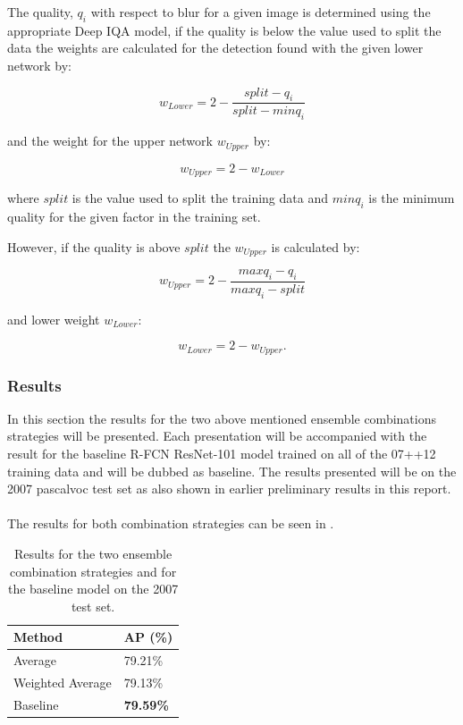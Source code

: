The quality, $q_i$ with respect to blur for a given image is determined using the appropriate Deep IQA model, if the quality is below the value used to split the data the weights are calculated for the detection found with the given lower network by:

\begin{equation}
	w_{Lower} = 2 - \frac{split - q_i}{split - minq_i}
\end{equation}

and the weight for the upper network $w_{Upper}$ by:

\begin{equation}
	w_{Upper} = 2 - w_{Lower}
\end{equation}

where $split$ is the value used to split the training data and $minq_i$ is the minimum quality for the given factor in the training set.

However, if the quality is above $split$ the $w_{Upper}$ is calculated by:

\begin{equation}
	w_{Upper} = 2 - \frac{maxq_i - q_i}{maxq_i - split}
\end{equation}

and lower weight $w_{Lower}$:

\begin{equation}
	w_{Lower} = 2 - w_{Upper}.
\end{equation}

\subsubsection{Results}
In this section the results for the two above mentioned ensemble combinations strategies will be presented. Each presentation will be accompanied with the result for the baseline R-FCN ResNet-101 model trained on all of the 07++12 training data and will be dubbed as baseline. The results presented will be on the 2007 \gls{pascalvoc} test set as also shown in earlier preliminary results in this report.
\\\\
The results for both combination strategies can be seen in .

\begin{table}[h]
\centering
\caption{Results for the two ensemble combination strategies and for the baseline model on the 2007 test set.}
\label{tab:avgres1}
\begin{tabular}{|l|l|}
\hline
\textbf{Method}           & \textbf{AP (\%)} \\ \hline
Average          & 79.21\% \\ \hline
Weighted Average & 79.13\% \\ \hline
Baseline         & \textbf{79.59\%} \\ \hline
\end{tabular}
\end{table}

